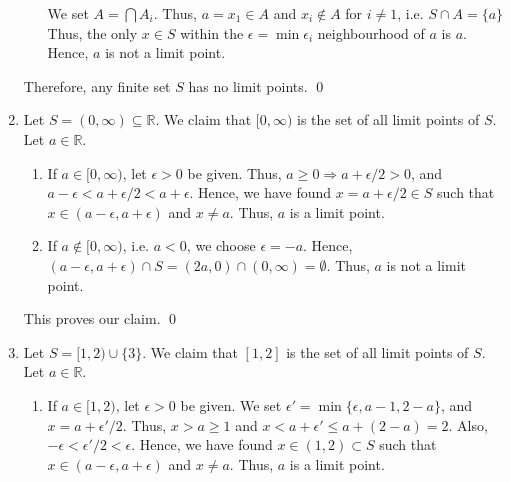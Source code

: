 \documentclass[10pt]{article}
\begin{document}
\begin{enumerate}
\begin{enumerate}
                        We set $A = \bigcap A_i$.
                        Thus, $a = x_1 \in A$ and $x_i \notin A$ for $i \neq 1$, i.e. $S \cap A = \{a\}$
                        Thus, the only $x \in S$ within the $\epsilon = \min \epsilon_i$ neighbourhood of $a$
                        is $a$.
                        Hence, $a$ is not a limit point.
                \end{enumerate}
                Therefore, any finite set $S$ has no limit points. \qed

                \item Let $S = (0, \infty) \subseteq \mathbb{R}$. We claim that $[0, \infty)$ is the set of all limit points of $S$.
                Let $a \in \mathbb{R}$.
                \begin{enumerate}
                        \item If $a \in [0, \infty)$, let $\epsilon > 0$ be given. Thus, $a \ge 0 \Rightarrow a + \epsilon/2 > 0$,
                        and $a - \epsilon < a + \epsilon/2 < a + \epsilon$.
                        Hence, we have found $x = a + \epsilon/2 \in S$ such that $x \in (a - \epsilon, a + \epsilon)$ and $x \neq a$.
                        Thus, $a$ is a limit point.
                        
                        \item If $a \notin [0, \infty)$, i.e. $a < 0$, we choose $\epsilon = -a$. Hence, $(a - \epsilon, a + \epsilon) \cap
                        S = (2a, 0) \cap (0, \infty) = \emptyset$. Thus, $a$ is not a limit point.
                \end{enumerate}
                This proves our claim. \qed

                \item Let $S = [1, 2) \cup \{3\}$. We claim that $[1, 2]$ is the set of all limit points of $S$.
                Let $a \in \mathbb{R}$.
                \begin{enumerate}
                        \item If $a \in [1, 2)$, let $\epsilon > 0$ be given. We set $\epsilon' = \min\{\epsilon, a - 1, 2 - a\}$, and
                        $x = a + \epsilon'/2$. Thus, $x > a \ge 1$ and $x < a + \epsilon' \le a + (2 - a) = 2$.
                        Also, $-\epsilon < \epsilon'/2 < \epsilon$.
                        Hence, we have found $x \in (1, 2) \subset S$ such that $x \in (a - \epsilon, a + \epsilon)$ and
                        $x \neq a$. Thus, $a$ is a limit point.


\end{enumerate}
\end{enumerate}
\end{document}
